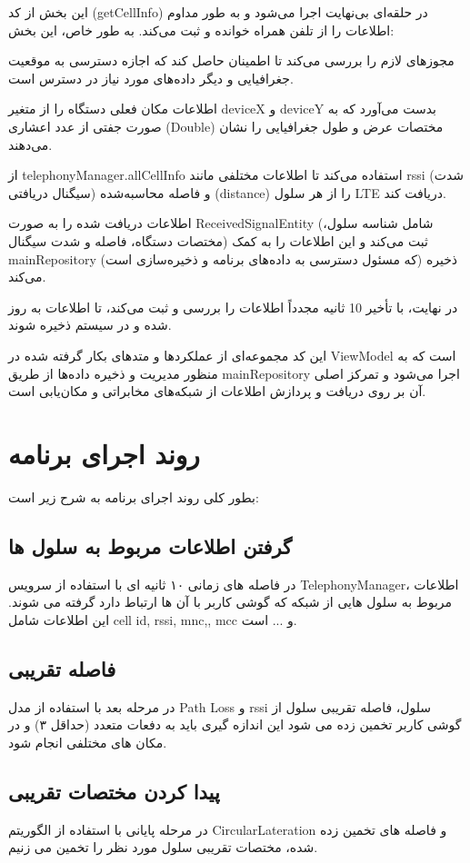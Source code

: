 \documentclass[11pt]{article}
\begin{document}
این بخش از کد (getCellInfo) در حلقه‌ای بی‌نهایت اجرا می‌شود و به طور مداوم اطلاعات را از تلفن همراه خوانده و ثبت می‌کند. به طور خاص، این بخش:

مجوزهای لازم را بررسی می‌کند تا اطمینان حاصل کند که اجازه دسترسی به موقعیت جغرافیایی و دیگر داده‌های مورد نیاز در دسترس است.

اطلاعات مکان فعلی دستگاه را از متغیر deviceX و deviceY بدست می‌آورد که به صورت جفتی از عدد اعشاری (Double) مختصات عرض و طول جغرافیایی را نشان می‌دهند.

از telephonyManager.allCellInfo استفاده می‌کند تا اطلاعات مختلفی مانند rssi (شدت سیگنال دریافتی) و فاصله محاسبه‌شده (distance) را از هر سلول LTE دریافت کند.

اطلاعات دریافت شده را به صورت ReceivedSignalEntity (شامل شناسه سلول، مختصات دستگاه، فاصله و شدت سیگنال) ثبت می‌کند و این اطلاعات را به کمک mainRepository (که مسئول دسترسی به داده‌های برنامه و ذخیره‌سازی است) ذخیره می‌کند.

در نهایت، با تأخیر 10 ثانیه مجدداً اطلاعات را بررسی و ثبت می‌کند، تا اطلاعات به روز شده و در سیستم ذخیره شوند.

این کد مجموعه‌ای از عملکردها و متدهای بکار گرفته شده در ViewModel است که به منظور مدیریت و ذخیره داده‌ها از طریق mainRepository اجرا می‌شود و تمرکز اصلی آن بر روی دریافت و پردازش اطلاعات از شبکه‌های مخابراتی و مکان‌یابی است.

\section{روند اجرای برنامه }
بطور کلی روند اجرای برنامه به شرح زیر است:
\subsection{گرفتن اطلاعات مربوط به سلول ها}
در فاصله های زمانی ۱۰ ثانیه ای‌ با استفاده از سرویس TelephonyManager، اطلاعات مربوط به سلول هایی از شبکه که گوشی کاربر با آن ها ارتباط دارد گرفته می شوند. این اطلاعات شامل cell id, rssi, mnc,, mcc و ... است.
\subsection{فاصله تقریبی}
در مرحله بعد با استفاده از مدل Path Loss و rssi سلول، فاصله تقریبی سلول از گوشی کاربر تخمین زده می شود
این اندازه گیری باید به دفعات متعدد (حداقل ۳) و در مکان های مختلفی انجام شود.
\subsection{پیدا کردن مختصات تقریبی}
در مرحله پایانی با استفاده از الگوریتم CircularLateration و فاصله های تخمین زده شده، مختصات تقریبی سلول مورد نظر را تخمین می زنیم.
\end{document}
